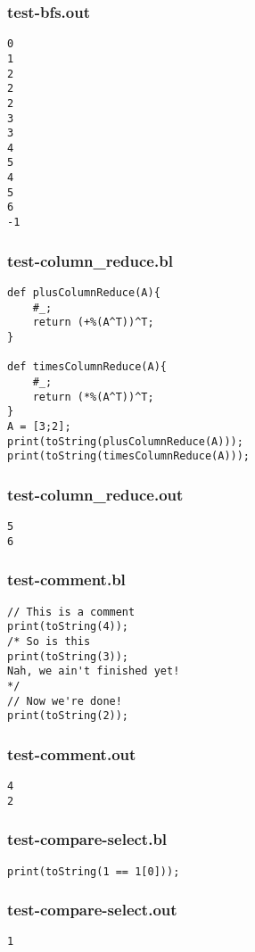 \subsubsection{test-bfs.out}
\begin{lstlisting}
0
1
2
2
2
3
3
4
5
4
5
6
-1
\end{lstlisting}
\subsubsection{test-column\_reduce.bl}
\begin{lstlisting}
def plusColumnReduce(A){
    #_;
    return (+%(A^T))^T;
}

def timesColumnReduce(A){
    #_;
    return (*%(A^T))^T;
}
A = [3;2];
print(toString(plusColumnReduce(A)));
print(toString(timesColumnReduce(A)));
\end{lstlisting}
\subsubsection{test-column\_reduce.out}
\begin{lstlisting}
5
6
\end{lstlisting}
\subsubsection{test-comment.bl}
\begin{lstlisting}
// This is a comment
print(toString(4));
/* So is this
print(toString(3));
Nah, we ain't finished yet!
*/
// Now we're done!
print(toString(2));
\end{lstlisting}
\subsubsection{test-comment.out}
\begin{lstlisting}
4
2
\end{lstlisting}
\subsubsection{test-compare-select.bl}
\begin{lstlisting}
print(toString(1 == 1[0]));
\end{lstlisting}
\subsubsection{test-compare-select.out}
\begin{lstlisting}
1
\end{lstlisting}
